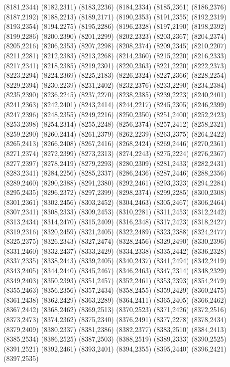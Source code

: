 (8181,2344)
(8182,2311)
(8183,2236)
(8184,2334)
(8185,2361)
(8186,2376)
(8187,2192)
(8188,2213)
(8189,2171)
(8190,2353)
(8191,2355)
(8192,2319)
(8193,2354)
(8194,2275)
(8195,2286)
(8196,2328)
(8197,2190)
(8198,2392)
(8199,2286)
(8200,2390)
(8201,2299)
(8202,2323)
(8203,2367)
(8204,2374)
(8205,2216)
(8206,2353)
(8207,2298)
(8208,2374)
(8209,2345)
(8210,2207)
(8211,2281)
(8212,2383)
(8213,2268)
(8214,2360)
(8215,2220)
(8216,2333)
(8217,2341)
(8218,2385)
(8219,2301)
(8220,2363)
(8221,2220)
(8222,2373)
(8223,2294)
(8224,2369)
(8225,2183)
(8226,2324)
(8227,2366)
(8228,2254)
(8229,2394)
(8230,2239)
(8231,2402)
(8232,2376)
(8233,2290)
(8234,2384)
(8235,2390)
(8236,2245)
(8237,2270)
(8238,2385)
(8239,2223)
(8240,2401)
(8241,2363)
(8242,2401)
(8243,2414)
(8244,2217)
(8245,2305)
(8246,2399)
(8247,2396)
(8248,2355)
(8249,2216)
(8250,2350)
(8251,2400)
(8252,2423)
(8253,2398)
(8254,2314)
(8255,2248)
(8256,2374)
(8257,2412)
(8258,2321)
(8259,2290)
(8260,2414)
(8261,2379)
(8262,2239)
(8263,2375)
(8264,2422)
(8265,2413)
(8266,2408)
(8267,2416)
(8268,2424)
(8269,2446)
(8270,2361)
(8271,2374)
(8272,2399)
(8273,2313)
(8274,2243)
(8275,2224)
(8276,2367)
(8277,2397)
(8278,2419)
(8279,2293)
(8280,2309)
(8281,2433)
(8282,2431)
(8283,2341)
(8284,2256)
(8285,2337)
(8286,2436)
(8287,2446)
(8288,2356)
(8289,2460)
(8290,2388)
(8291,2380)
(8292,2461)
(8293,2323)
(8294,2284)
(8295,2435)
(8296,2372)
(8297,2399)
(8298,2374)
(8299,2285)
(8300,2308)
(8301,2361)
(8302,2456)
(8303,2452)
(8304,2463)
(8305,2467)
(8306,2464)
(8307,2341)
(8308,2333)
(8309,2453)
(8310,2281)
(8311,2453)
(8312,2442)
(8313,2434)
(8314,2470)
(8315,2409)
(8316,2348)
(8317,2423)
(8318,2427)
(8319,2316)
(8320,2459)
(8321,2405)
(8322,2489)
(8323,2388)
(8324,2477)
(8325,2375)
(8326,2343)
(8327,2474)
(8328,2456)
(8329,2490)
(8330,2396)
(8331,2460)
(8332,2437)
(8333,2429)
(8334,2338)
(8335,2442)
(8336,2328)
(8337,2335)
(8338,2443)
(8339,2405)
(8340,2437)
(8341,2494)
(8342,2419)
(8343,2405)
(8344,2440)
(8345,2467)
(8346,2463)
(8347,2314)
(8348,2329)
(8349,2403)
(8350,2393)
(8351,2457)
(8352,2461)
(8353,2393)
(8354,2479)
(8355,2463)
(8356,2356)
(8357,2434)
(8358,2455)
(8359,2429)
(8360,2475)
(8361,2438)
(8362,2429)
(8363,2289)
(8364,2411)
(8365,2405)
(8366,2462)
(8367,2442)
(8368,2462)
(8369,2513)
(8370,2523)
(8371,2426)
(8372,2516)
(8373,2473)
(8374,2362)
(8375,2340)
(8376,2491)
(8377,2278)
(8378,2434)
(8379,2409)
(8380,2337)
(8381,2386)
(8382,2377)
(8383,2510)
(8384,2413)
(8385,2534)
(8386,2525)
(8387,2503)
(8388,2519)
(8389,2333)
(8390,2525)
(8391,2521)
(8392,2461)
(8393,2401)
(8394,2355)
(8395,2440)
(8396,2421)
(8397,2535)
